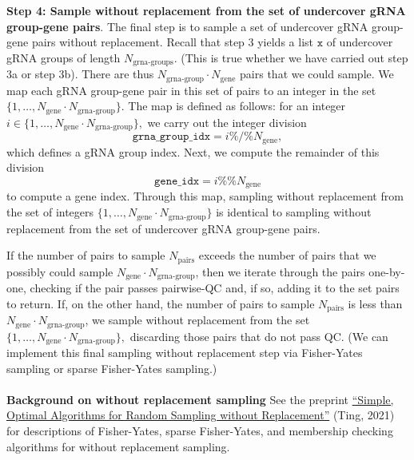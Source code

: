 \documentclass[12pt]{article}
\begin{document}
\\ \\
\textbf{Step 4: Sample without replacement from the set of undercover gRNA group-gene pairs}. The final step is to sample a set of undercover gRNA group-gene pairs without replacement. Recall that step 3 yields a list $\texttt{x}$ of undercover gRNA groups of length $N_\textrm{grna-groups}$. (This is true whether we have carried out step 3a or step 3b). There are thus $N_\textrm{grna-group} \cdot N_\textrm{gene}$ pairs that we could sample. We map each gRNA group-gene pair in this set of pairs to an integer in the set $\{1, \dots, N_\textrm{gene} \cdot N_\textrm{grna-group} \}.$ The map is defined as follows: for an integer $i \in \{1, \dots, N_\textrm{gene} \cdot N_\textrm{grna-group}\},$ we carry out the integer division $$ \texttt{grna\_group\_idx} = i \%/\% N_\textrm{gene},$$ which defines a gRNA group index. Next, we compute the remainder of this division
$$ \texttt{gene\_idx} = i \%\% N_\textrm{gene}$$ to compute a gene index. Through this map, sampling without replacement from the set of integers $\{1, \dots, N_\textrm{gene} \cdot N_\textrm{grna-group}\}$ is identical to sampling without replacement from the set of undercover gRNA group-gene pairs.

If the number of pairs to sample $N_\textrm{pairs}$ exceeds the number of pairs that we possibly could sample $ N_\textrm{gene} \cdot N_\textrm{grna-group}$, then we iterate through the pairs one-by-one, checking if the pair passes pairwise-QC and, if so, adding it to the set pairs to return. If, on the other hand, the number of pairs to sample $N_\textrm{pairs}$ is less than $N_\textrm{gene} \cdot N_\textrm{grna-group}$, we sample without replacement from the set $\{ 1, \dots, N_\textrm{gene} \cdot N_\textrm{grna-group} \},$ discarding those pairs that do not pass QC. (We can implement this final sampling without replacement step via Fisher-Yates sampling or sparse Fisher-Yates sampling.)
\\ \\
\textbf{Background on without replacement sampling}
See the preprint  \href{https://arxiv.org/abs/2104.05091}{``Simple, Optimal Algorithms for Random Sampling without Replacement''} (Ting, 2021) for descriptions of Fisher-Yates, sparse Fisher-Yates, and membership checking algorithms for without replacement sampling.




\end{document}
